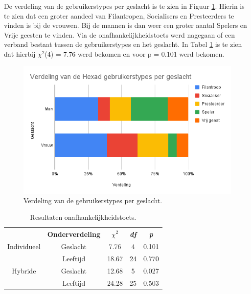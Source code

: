 De verdeling van de gebruikerstypes per geslacht is te zien in Figuur \ref{fig:verdelinggeslacht}. Hierin is te zien dat een groter aandeel van Filantropen, Socialisers en Presteerders te vinden is bij de vrouwen. Bij de mannen is dan weer een groter aantal Spelers en Vrije geesten te vinden. Via de onafhankelijkheidstoets werd nagegaan of een verband bestaat tussen de gebruikerstypes en het geslacht. In Tabel \ref{tab:onafhankelijkheidstoets} is te zien dat hierbij $\chi^2$(4) = 7.76 werd bekomen en voor p = 0.101 werd bekomen.

\begin{figure}
    \includegraphics[width=\linewidth]{VerdelingGeslacht.png}
    \caption{Verdeling van de gebruikerstypes per geslacht.}
    \label{fig:verdelinggeslacht}
\end{figure}

\begin{table}
    \begin{center}
    \begin{tabular}{c|c|c|c|c}
        & Onderverdeling & $\chi^2$ & \textit{df} & \textit{p}     \\  
        \hline
        Individueel & Geslacht       & 7.76  & 4  & 0.101 \\
        & Leeftijd       & 18.67 & 24 & 0.770 \\ 
        \hline
        Hybride     & Geslacht       & 12.68 & 5  & 0.027 \\
        & Leeftijd       & 24.28 & 25 & 0.503 \\
    \end{tabular}
    \end{center}
\caption{Resultaten onafhankelijkheidstoets.}
\label{tab:onafhankelijkheidstoets}
\end{table}

